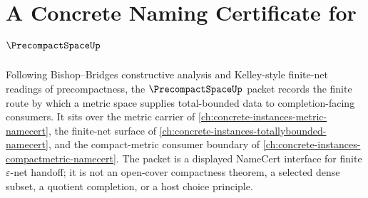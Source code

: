 \chapter{A Concrete Naming Certificate for $\PrecompactSpaceUp$}
\label{ch:concrete-instances-precompact-space-namecert}

Following Bishop--Bridges constructive analysis and Kelley-style finite-net readings of precompactness, the $\PrecompactSpaceUp$ packet records the finite route by which a metric space supplies total-bounded data to completion-facing consumers. It sits over the metric carrier of \autoref{ch:concrete-instances-metric-namecert}, the finite-net surface of \autoref{ch:concrete-instances-totallybounded-namecert}, and the compact-metric consumer boundary of \autoref{ch:concrete-instances-compactmetric-namecert}. The packet is a displayed NameCert interface for finite $\varepsilon$-net handoff; it is not an open-cover compactness theorem, a selected dense subset, a quotient completion, or a host choice principle.

